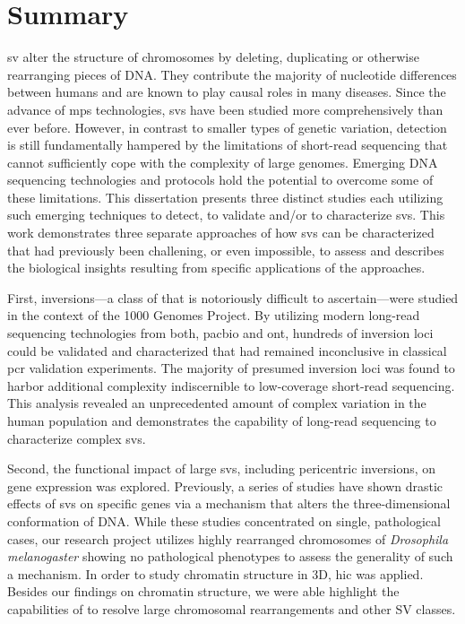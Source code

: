 \cleardoublepage
{}
\chapter*{Summary}

\Acf{sv} alter the structure of chromosomes by deleting, duplicating or
otherwise rearranging pieces of DNA. They contribute the majority of nucleotide
differences between humans and are known to play causal roles in many diseases.
Since the advance of \acf{mps} technologies, \acp{sv} have been
studied more comprehensively than ever before. However, in contrast to smaller
types of genetic variation, \sv detection is still fundamentally hampered by
the limitations of short-read sequencing that cannot sufficiently cope with the
complexity of large genomes. Emerging DNA sequencing technologies and protocols
hold the potential to overcome some of these limitations. This dissertation
presents three distinct studies each utilizing such emerging techniques to
detect, to validate and/or to characterize \acp{sv}. This work demonstrates
three separate approaches of how \acp{sv} can be characterized that had previously been
challening, or even impossible, to assess and describes the biological insights
resulting from specific applications of the approaches.

First, inversions---a class of \sv that is notoriously difficult to
ascertain---were studied in the context of the 1000 Genomes Project. By utilizing
modern long-read sequencing technologies from both, \acl{pacbio} and \acl{ont},
hundreds of inversion loci could be validated and characterized that had remained
inconclusive in classical \acs{pcr} validation experiments. The majority of presumed
inversion loci was found to harbor additional complexity indiscernible to
low-coverage short-read sequencing. This analysis revealed an unprecedented amount of
complex variation in the human population and demonstrates the capability of
long-read sequencing to characterize complex \acp{sv}.

Second, the functional impact of large \acp{sv}, including
pericentric inversions, on gene expression was explored. Previously, a series of
studies have shown drastic effects of \acp{sv} on specific genes via a mechanism that alters
the three-dimensional conformation of DNA. While these studies concentrated on
single, pathological cases, our research project utilizes highly rearranged
chromosomes of \textit{Drosophila melanogaster} showing no pathological
phenotypes to assess the generality of such a mechanism. In order to study
chromatin structure in 3D, \acf{hic} was applied. Besides our findings on
chromatin structure, we were able highlight the capabilities of \hic to resolve
large chromosomal rearrangements and other SV classes.

